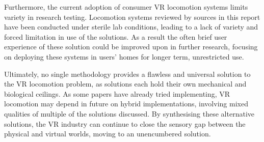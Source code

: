 \documentclass[conference]{IEEEtran}  %
\begin{document}
Furthermore, the current adoption of consumer VR locomotion systems limits variety in research testing. Locomotion systems reviewed by sources in this report have been conducted under sterile lab conditions, leading to a lack of variety and forced limitation in use of the solutions. As a result the often brief user experience of these solution could be improved upon in further research, focusing on deploying these systems in users' homes for longer term, unrestricted use. 

Ultimately, no single methodology provides a flawless and universal solution to the VR locomotion problem, as solutions each hold their own mechanical and biological ceilings. As some papers have already tried implementing, VR locomotion may depend in future on hybrid implementations, involving mixed qualities of multiple of the solutions discussed. By synthesising these alternative solutions, the VR industry can continue to close the sensory gap between the physical and virtual worlds, moving to an unencumbered solution.


\end{document}
